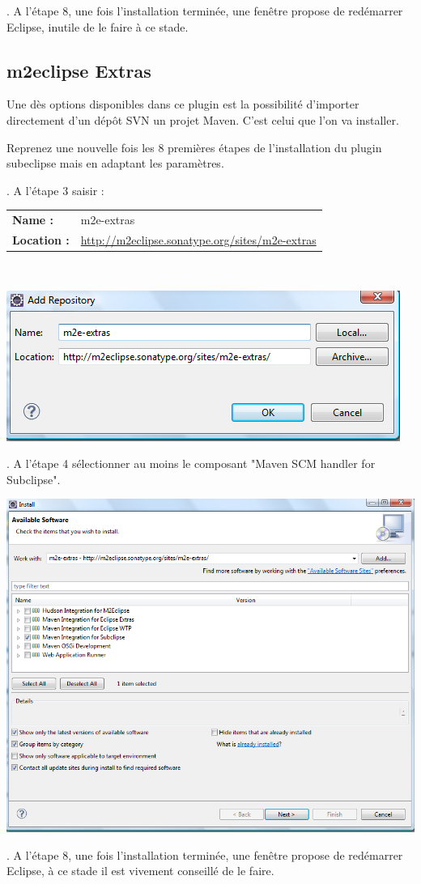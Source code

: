 . A l'étape 8, une fois l'installation terminée, une fenêtre propose de redémarrer Eclipse, inutile de le faire à ce stade.





\subsection{m2eclipse Extras}
Une dès options disponibles dans ce plugin est la possibilité d'importer directement d'un dépôt SVN un projet Maven. C'est celui que l'on va installer.

\medskip

\noindent
Reprenez une nouvelle fois les 8 premières étapes de l'installation du plugin subeclipse mais en adaptant les paramètres.

\newpage

. A l'étape 3 saisir :\\

\begin{tabular}[!t]{ll}
{\bf Name : }&{m2e-extras}\\
{\bf Location : }&{\href{http://m2eclipse.sonatype.org/sites/m2e-extras}{http://m2eclipse.sonatype.org/sites/m2e-extras}}\\
\end{tabular}\\

\smallskip
\begin{center}
\includegraphics[width=0.4\linewidth]{../../resources/images/guide_installation/m2eclipseExtrasUrl.png}
\end{center}

. A l'étape 4 sélectionner au moins le composant "Maven SCM handler for Subclipse".\\
\begin{center}
\includegraphics[width=0.4\linewidth]{../../resources/images/guide_installation/m2eclipseExtrasEtape1.png}
\end{center}

. A l'étape 8, une fois l'installation terminée, une fenêtre propose de redémarrer Eclipse, à ce stade il est vivement conseillé de le faire.





